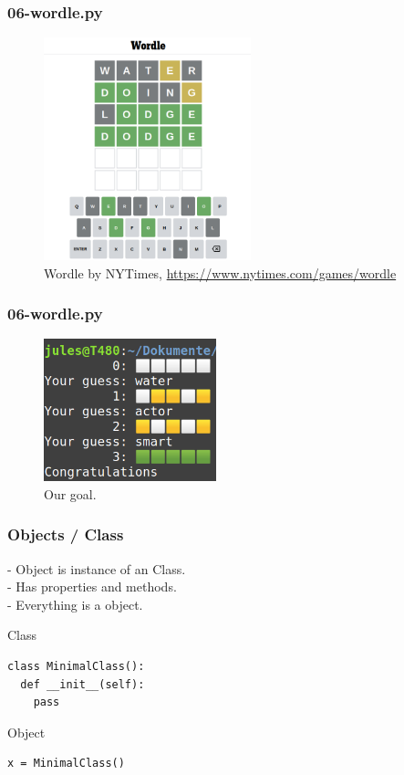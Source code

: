 \documentclass{beamer}
\begin{document}
\begin{frame}[fragile]
	\frametitle{06-wordle.py}
	\begin{figure}
		\includegraphics[width=6cm]{figures/wordle.png}
		\caption{Wordle by NYTimes, \url{https://www.nytimes.com/games/wordle}}
	\end{figure}
\end{frame}

\begin{frame}[fragile]
	\frametitle{06-wordle.py}
	\begin{figure}
		\includegraphics[width=5cm]{figures/wordle_terminal.png}
		\caption{Our goal.}
	\end{figure}
\end{frame}

\begin{frame}[fragile]
	\frametitle{Objects / Class}
	- Object is instance of an Class.\\
	- Has properties and methods. \\
	- Everything is a object.\\
\begin{block}{Class}
	
	\begin{verbatim}
class MinimalClass():
  def __init__(self):
    pass
	\end{verbatim}
\end{block}	
\begin{block}{Object}
\begin{verbatim}
x = MinimalClass()
\end{verbatim}	
\end{block}	
\end{frame}
\end{document}
